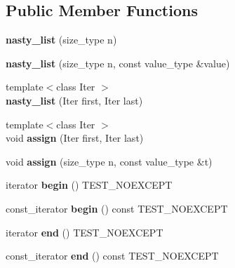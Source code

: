 \subsection*{Public Member Functions}
\begin{DoxyCompactItemize}
\item 
\mbox{\label{classnasty__list_a50476548629b27778d4694a775f077f1}} 
{\bfseries nasty\+\_\+list} (size\+\_\+type n)
\item 
\mbox{\label{classnasty__list_a97829a9f8883a768e82480ad918c287a}} 
{\bfseries nasty\+\_\+list} (size\+\_\+type n, const value\+\_\+type \&value)
\item 
\mbox{\label{classnasty__list_a6a506f4508fd446a30087cb7257649d8}} 
{\footnotesize template$<$class Iter $>$ }\\{\bfseries nasty\+\_\+list} (Iter first, Iter last)
\item 
\mbox{\label{classnasty__list_aa443dd07585a29aeceb4550eae2d6b9b}} 
{\footnotesize template$<$class Iter $>$ }\\void {\bfseries assign} (Iter first, Iter last)
\item 
\mbox{\label{classnasty__list_ad938429fc265b8ca0afa20072bde119b}} 
void {\bfseries assign} (size\+\_\+type n, const value\+\_\+type \&t)
\item 
\mbox{\label{classnasty__list_a7b4e1e939a4e1969e13999c288ffc830}} 
iterator {\bfseries begin} () T\+E\+S\+T\+\_\+\+N\+O\+E\+X\+C\+E\+PT
\item 
\mbox{\label{classnasty__list_abac0b4b25553585601e0d808de9f6cf4}} 
const\+\_\+iterator {\bfseries begin} () const T\+E\+S\+T\+\_\+\+N\+O\+E\+X\+C\+E\+PT
\item 
\mbox{\label{classnasty__list_aa6a5d5a995269a58f3acb0891c6cc741}} 
iterator {\bfseries end} () T\+E\+S\+T\+\_\+\+N\+O\+E\+X\+C\+E\+PT
\item 
\mbox{\label{classnasty__list_a61b69952cc9438a6d3f84a8a2fa1d7f2}} 
const\+\_\+iterator {\bfseries end} () const T\+E\+S\+T\+\_\+\+N\+O\+E\+X\+C\+E\+PT

\end{DoxyCompactItemize}
